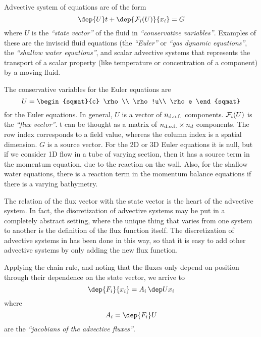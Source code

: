 


Advective system of equations are of the form
%
\begin{equation} 
 \dep{U}t+\dep{\F_i(U)}{x_i} = G
\end{equation}
%
%
where $U$ is the \emph{``state vector''} of the fluid in
\emph{``conservative variables''}. Examples of these are the inviscid
fluid equations (the \emph{``Euler''} or \emph{``gas dynamic
equations''}, the \emph{``shallow water equations''}, and scalar
advective systems that represents the transport of a scalar property
(like temperature or concentration of a component) by a moving fluid. 

The conservative variables for the Euler equations are
%
\begin{equation} 
 U=\begin{sqmat}{c}
        \rho\\
         \rho!u\\
        \rho e
   \end{sqmat}
\end{equation}
%
for the Euler equations. In general, $U$ is a vector of ${n_{\mathrm{d.o.f.}}}$
components. $\mathcal{F}_i(U)$ is the \emph{``flux vector''}. t can be thought
as a matrix of ${n_{\mathrm{d.o.f.}}}\times{n_d}$ components. The row index corresponds
to a field value, whereas the column index is a spatial dimension. 
$G$ is a source vector. For the 2D or 3D Euler equations it is null,
but if we consider 1D flow in a tube of varying section, then it has a
source term in the momentum equation, due to the reaction on the
wall. Also, for the shallow water equations, there is a reaction term
in the momentum balance equations if there is a varying bathymetry.

The relation of the flux vector with the state vector is the heart of
the advective system. In fact, the discretization of advective systems
may be put in a completely abstract setting, where the unique thing
that varies from one system to another is the definition of the flux
function itself. The discretization of advective systems in \pfem{}
has been done in this way, so that it is easy to add other advective
systems by only adding the new flux function. 

Applying the chain rule, and noting that the fluxes only depend on
position through their dependence on the state vector, we arrive to
%
\begin{equation} 
   \dep {F_i}{x_i} = A_i\, \dep U{x_i}
\end{equation}
%
where 
%
\begin{equation}\label{eq:jacflux}
A_i = \dep {F_i}U
\end{equation}
%
are the \emph{``jacobians of the advective fluxes''}. 

